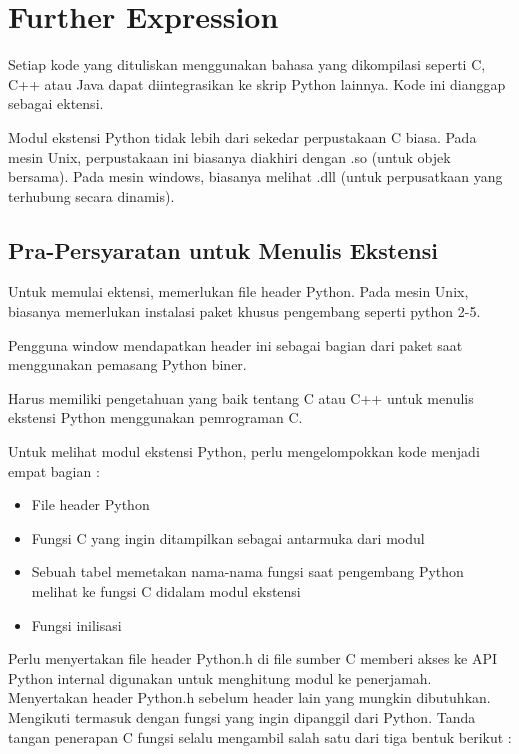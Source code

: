 \section{Further Expression}
\hspace*{0.5in} Setiap kode yang dituliskan menggunakan bahasa yang dikompilasi seperti C, C++ atau Java dapat diintegrasikan ke skrip Python lainnya. Kode ini dianggap sebagai ektensi. 

\hspace*{0.5in} Modul ekstensi Python tidak lebih dari sekedar perpustakaan C biasa. Pada mesin Unix, perpustakaan ini biasanya diakhiri dengan .so (untuk objek bersama). Pada mesin windows, biasanya melihat .dll (untuk perpusatkaan yang terhubung secara dinamis).  


\subsection{Pra-Persyaratan untuk Menulis Ekstensi} 

\hspace*{0.5in} Untuk memulai ektensi, memerlukan file header Python. Pada mesin Unix, biasanya memerlukan instalasi paket khusus pengembang seperti python 2-5. 

\hspace*{0.5in} Pengguna window mendapatkan header ini sebagai bagian dari paket saat menggunakan pemasang Python biner. 

\hspace*{0.5in} Harus memiliki pengetahuan yang baik tentang C atau C++ untuk menulis ekstensi Python menggunakan pemrograman C. 
 
\hspace*{0.5in} Untuk melihat modul ekstensi Python, perlu mengelompokkan kode menjadi empat bagian : 

\begin{itemize}
\item File header Python 
\item Fungsi C yang ingin ditampilkan sebagai antarmuka dari modul 
\item Sebuah tabel memetakan nama-nama fungsi saat pengembang Python melihat ke fungsi C didalam modul ekstensi 
\item Fungsi inilisasi
\end{itemize}
 
\vspace{12pt}
\hspace*{0.5in} Perlu menyertakan file header Python.h di file sumber C memberi akses ke API Python internal digunakan untuk menghitung modul ke penerjamah. 
Menyertakan header Python.h sebelum header lain yang mungkin dibutuhkan. Mengikuti termasuk dengan fungsi yang ingin dipanggil dari Python. 
Tanda tangan penerapan C fungsi selalu mengambil salah satu dari tiga bentuk berikut : 


